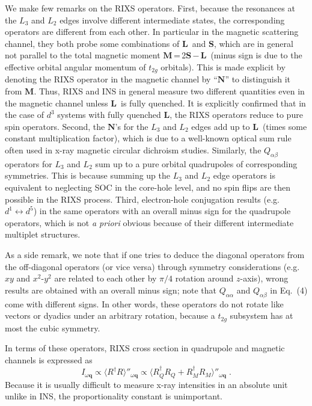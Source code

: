 \documentclass[twocolumn,prb,aps,showpacs,superscriptaddress]{revtex4-1}
\newcommand{\spin}{$\mathbf{S}$}
\newcommand{\orb}{$\mathbf{L}$}
\newcommand{\mom}{$\mathbf{M}$}
\begin{document}
We make few remarks on the RIXS operators. First, because the resonances at
the $L_3$ and $L_2$ edges involve different intermediate states, the
corresponding operators are different from each other. In particular in the
magnetic scattering channel, they both probe some combinations of \orb\, and
\spin, which are in general not parallel to the total magnetic moment
\mom\,=\,2\spin\,$-$\,\orb\, (minus sign is due to the effective orbital
angular momentum of $t_{2g}$ orbitals\cite{Abragam}). This is made explicit by
denoting the RIXS operator in the magnetic channel by ``${\mathbf N}$'' to
distinguish it from ${\mathbf M}$. Thus, RIXS and INS in general measure two
different quantities even in the magnetic channel unless \orb\, is fully
quenched. It is explicitly confirmed that in the case of $d^3$ systems with
fully quenched \orb, the RIXS operators reduce to pure spin operators. Second,
the ${\mathbf N}$'s for the $L_3$ and $L_2$ edges add up to \orb\, (times some
constant multiplication factor), which is due to a well-known optical sum rule
often used in x-ray magnetic circular dichroism studies\cite{TholePRL92}. 
Similarly, the $Q_{\alpha \beta}$ operators for $L_3$ and $L_2$ sum up to
a pure orbital quadrupoles of corresponding symmetries. This is because summing
up the $L_3$ and $L_2$ edge operators is equivalent to neglecting SOC in the 
core-hole level, and no spin flips are then possible in the RIXS process.      
Third, electron-hole conjugation results (e.g. $d^1\leftrightarrow d^5$) in 
the same operators with an overall minus sign for the quadrupole operators, 
which is not {\it a priori} obvious because of their different intermediate 
multiplet structures. 

As a side remark, we note that if one tries to deduce the diagonal operators
from the off-diagonal  operators (or vice versa) through symmetry
considerations (e.g. $xy$ and $x^2$-$y^2$ are related to each other by $\pi/4$
rotation around $z$-axis), wrong results are obtained with an overall minus
sign; note that $Q_{\alpha \alpha}$ and $Q_{\alpha \beta}$ in Eq.~(4) come
with different signs. In other words, these operators do not rotate like
vectors or dyadics under an arbitrary rotation, because a $t_{2g}$ subsystem
has at most the cubic symmetry.  

In terms of these operators, RIXS cross section in quadrupole and magnetic
channels is expressed as 
\begin{equation}
I_{\omega \mathbf q}\propto\langle R^\dagger R\rangle''_{\omega \mathbf q}
\propto\langle R_Q^\dagger R_Q + R_M^\dagger R_M\rangle''_{\omega \mathbf q}\;.
\end{equation}
Because it is usually difficult to measure x-ray intensities in an absolute
unit unlike in INS, the proportionality constant is unimportant. 
\end{document}
